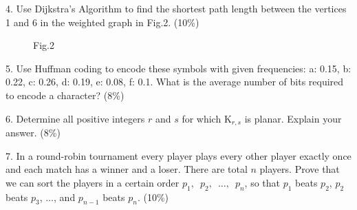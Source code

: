 \documentclass{article}
\begin{document}
\clearpage

4. Use Dijkstra's Algorithm to find the shortest path length between the vertices 1 and 6 in the weighted graph in Fig.2. (10\%)

\begin{figure}[htbp]
    \centering
    \caption{Fig.2}
\end{figure}

5. Use Huffman coding to encode these symbols with given frequencies: a: 0.15, b: 0.22, c: 0.26, d: 0.19, e: 0.08, f: 0.1. What is the average number of bits required to encode a character? (8\%)

6. Determine all positive integers $\mathit{r}$ and $\mathit{s}$ for which $\mathrm{K}_{r,s}$ is planar. Explain your answer. (8\%)

7. In a round-robin tournament every player plays every other player exactly once and each match has a winner and a loser. There are total $\mathit{n}$ players. Prove that we can sort the players in a certain order 
$p_{1}, \enspace p_{2}, \enspace \ldots , \enspace p_{n}$, so that $p_{1}$ beats $p_{2}$, $p_{2}$ beats $p_{3}$, $\ldots$, and $p_{n-1}$ beats $p_{n}$. (10\%) 
\end{document}
